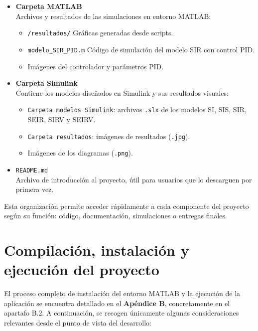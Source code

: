 \begin{itemize}
    \item \textbf{Carpeta MATLAB} \\
    Archivos y resultados de las simulaciones en entorno MATLAB:
    \begin{itemize}
        \item \texttt{/resultados/} \hfill Gráficas generadas desde scripts.
        \item \texttt{modelo\_SIR\_PID.m} \hfill Código de simulación del modelo SIR con control PID.
        \item Imágenes del controlador y parámetros PID.
    \end{itemize}

    \item \textbf{Carpeta Simulink} \\
    Contiene los modelos diseñados en Simulink y sus resultados visuales:
    \begin{itemize}
        \item \texttt{Carpeta modelos Simulink}: archivos \texttt{.slx} de los modelos SI, SIS, SIR, SEIR, SIRV y SEIRV.
        \item \texttt{Carpeta resultados}: imágenes de resultados (\texttt{.jpg}).
        \item Imágenes de los diagramas (\texttt{.png}).
    \end{itemize}

    \item \texttt{README.md} \\
    Archivo de introducción al proyecto, útil para usuarios que lo descarguen por primera vez.
\end{itemize}

Esta organización permite acceder rápidamente a cada componente del proyecto según su función: código, documentación, simulaciones o entregas finales.


\section{Compilación, instalación y ejecución del proyecto}

El proceso completo de instalación del entorno MATLAB y la ejecución de la aplicación se encuentra detallado en el \textbf{Apéndice B}, concretamente en el apartafo B.2. A continuación, se recogen únicamente algunas consideraciones relevantes desde el punto de vista del desarrollo:


